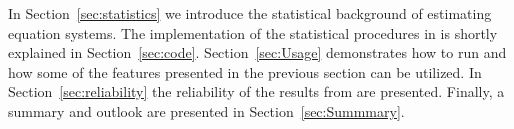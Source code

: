 In Section~\ref{sec:statistics} we introduce the statistical
background of estimating equation systems.
The implementation of the statistical procedures in  is
shortly explained in Section~\ref{sec:code}.
Section~\ref{sec:Usage} demonstrates how to run
 and how some of the features presented in the previous
section can be utilized.
In Section~\ref{sec:reliability} the reliability of the results from
 are presented.
Finally, a summary and outlook are presented in
Section~\ref{sec:Summmary}.


